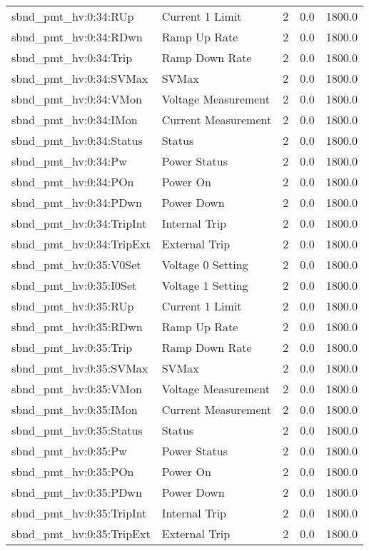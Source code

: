 \begin{center}
\begin{longtable}{l | l l l l }
sbnd\_pmt\_hv:0:34:RUp & Current 1 Limit & 2 & 0.0 & 1800.0\\ 
sbnd\_pmt\_hv:0:34:RDwn & Ramp Up Rate & 2 & 0.0 & 1800.0\\ 
sbnd\_pmt\_hv:0:34:Trip & Ramp Down Rate & 2 & 0.0 & 1800.0\\ 
sbnd\_pmt\_hv:0:34:SVMax & SVMax & 2 & 0.0 & 1800.0\\ 
sbnd\_pmt\_hv:0:34:VMon & Voltage Measurement & 2 & 0.0 & 1800.0\\ 
sbnd\_pmt\_hv:0:34:IMon & Current Measurement & 2 & 0.0 & 1800.0\\ 
sbnd\_pmt\_hv:0:34:Status & Status & 2 & 0.0 & 1800.0\\ 
sbnd\_pmt\_hv:0:34:Pw & Power Status & 2 & 0.0 & 1800.0\\ 
sbnd\_pmt\_hv:0:34:POn & Power On & 2 & 0.0 & 1800.0\\ 
sbnd\_pmt\_hv:0:34:PDwn & Power Down & 2 & 0.0 & 1800.0\\ 
sbnd\_pmt\_hv:0:34:TripInt & Internal Trip & 2 & 0.0 & 1800.0\\ 
sbnd\_pmt\_hv:0:34:TripExt & External Trip & 2 & 0.0 & 1800.0\\ 
sbnd\_pmt\_hv:0:35:V0Set & Voltage 0 Setting & 2 & 0.0 & 1800.0\\ 
sbnd\_pmt\_hv:0:35:I0Set & Voltage 1 Setting & 2 & 0.0 & 1800.0\\ 
sbnd\_pmt\_hv:0:35:RUp & Current 1 Limit & 2 & 0.0 & 1800.0\\ 
sbnd\_pmt\_hv:0:35:RDwn & Ramp Up Rate & 2 & 0.0 & 1800.0\\ 
sbnd\_pmt\_hv:0:35:Trip & Ramp Down Rate & 2 & 0.0 & 1800.0\\ 
sbnd\_pmt\_hv:0:35:SVMax & SVMax & 2 & 0.0 & 1800.0\\ 
sbnd\_pmt\_hv:0:35:VMon & Voltage Measurement & 2 & 0.0 & 1800.0\\ 
sbnd\_pmt\_hv:0:35:IMon & Current Measurement & 2 & 0.0 & 1800.0\\ 
sbnd\_pmt\_hv:0:35:Status & Status & 2 & 0.0 & 1800.0\\ 
sbnd\_pmt\_hv:0:35:Pw & Power Status & 2 & 0.0 & 1800.0\\ 
sbnd\_pmt\_hv:0:35:POn & Power On & 2 & 0.0 & 1800.0\\ 
sbnd\_pmt\_hv:0:35:PDwn & Power Down & 2 & 0.0 & 1800.0\\ 
sbnd\_pmt\_hv:0:35:TripInt & Internal Trip & 2 & 0.0 & 1800.0\\ 
sbnd\_pmt\_hv:0:35:TripExt & External Trip & 2 & 0.0 & 1800.0\\ 

\end{longtable}
\end{center}
